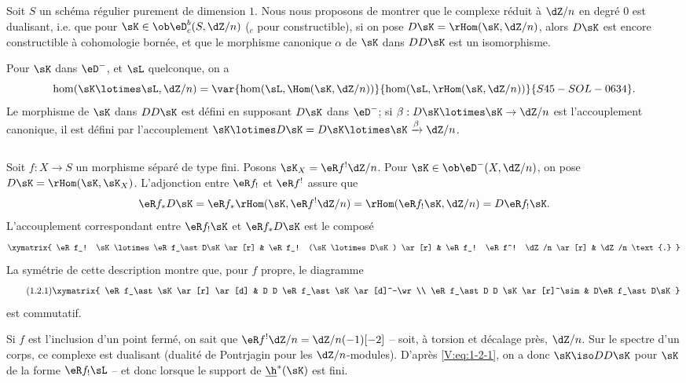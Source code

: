 \subsection{}\label{V:1-1}

Soit $S$ un schéma régulier purement de dimension $1$. Nous nous proposons 
de montrer que le complexe réduit à $\dZ/n$ en degré $0$ est 
dualisant, i.e. que pour $\sK\in \ob\eD_c^b(S,\dZ/n)$ (${}_c$ pour 
constructible), si on pose $D\sK=\rHom(\sK,\dZ/n)$, alors $D\sK$ est encore 
constructible à cohomologie bornée, et que le morphisme canonique $\alpha$ 
de $\sK$ dans $D D\sK$ est un isomorphisme. 

Pour $\sK$ dans $\eD^-$, et $\sL$ quelconque, on a 
\[
  \hom(\sK\lotimes \sL,\dZ/n) = \var{\hom(\sL,\Hom(\sK,\dZ/n))}{\hom(\sL,\rHom(\sK,\dZ/n))}{S45-SOL-0634} \text{.}
\]
Le morphisme de $\sK$ dans $DD\sK$ est défini en supposant $D\sK$ dans 
$\eD^-$; si $\beta:D\sK\lotimes\sK\to \dZ/n$ est l'accouplement canonique, il 
est défini par l'accouplement 
$\sK\lotimes D\sK=D\sK\lotimes \sK \xrightarrow\beta \dZ/n$. 





\subsection{}\label{V:1-2}

Soit $f:X\to S$ un morphisme séparé de type fini. Posons 
$\sK_X=\eR f^!\dZ/n$. Pour $\sK\in \ob\eD^-(X,\dZ/n)$, on pose 
$D\sK = \rHom(\sK,\sK_X)$. L'adjonction entre $\eR f_!$ et $\eR f^!$ 
assure que
\[
  \eR f_\ast D\sK = \eR f_\ast \rHom(\sK,\eR f^! \dZ/n) = \rHom(\eR f_! \sK,\dZ/n) = D\eR f_! \sK \text{.}
\]
L'accouplement correspondant entre $\eR f_! \sK$ et $\eR f_\ast D\sK$ est le composé 
\[\xymatrix{
  \eR f_! \sK\lotimes \eR f_\ast D\sK \ar[r] 
    & \eR f_! (\sK\lotimes D\sK) \ar[r] 
    & \eR f_! \eR f^! \dZ/n \ar[r] 
    & \dZ/n \text{.}
}\]
La symétrie de cette description montre que, pour $f$ propre, le diagramme 
\begin{equation*}\tag{1.2.1}\label{V:eq:1-2-1}
\xymatrix{
  \eR f_\ast \sK \ar[r] \ar[d] 
    & D D \eR f_\ast \sK \ar[d]^-\wr \\
  \eR f_\ast D D \sK \ar[r]^\sim 
    & D\eR f_\ast D\sK
}
\end{equation*}
est commutatif. 

Si $f$ est l'inclusion d'un point fermé, on sait que 
$\eR f^!\dZ/n=\dZ/n(-1)[-2]$ -- soit, à torsion et décalage près, $\dZ/n$. 
Sur le spectre d'un corps, ce complexe est dualisant (dualité de Pontrjagin 
pour les $\dZ/n$-modules). D'après \eqref{V:eq:1-2-1}, on a donc 
$\sK\iso D D\sK$ pour $\sK$ de la forme $\eR f_!\sL$ -- et donc lorsque le 
support de $\underline\h^*(\sK)$ est fini. 





